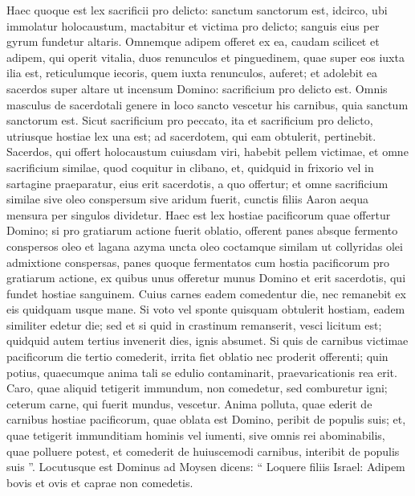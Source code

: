 \begin{biblechapter}
\begin{biblechapter}
\begin{biblechapter}
\begin{biblechapter}
\begin{biblechapter}
\begin{biblechapter}
\begin{biblechapter}
\verse Haec quoque est lex sacrificii pro delicto: sanctum sanctorum est, 
\verse idcirco, ubi immolatur holocaustum, mactabitur et victima pro delicto; sanguis eius per gyrum fundetur altaris. 
\verse Omnemque adipem offeret ex ea, caudam scilicet et adipem, qui operit vitalia, 
\verse duos renunculos et pinguedinem, quae super eos iuxta ilia est, reticulumque iecoris, quem iuxta renunculos, auferet; 
\verse et adolebit ea sacerdos super altare ut incensum Domino: sacrificium pro delicto est. 
\verse Omnis masculus de sacerdotali genere in loco sancto vescetur his carnibus, quia sanctum sanctorum est. 
\verse Sicut sacrificium pro peccato, ita et sacrificium pro delicto, utriusque hostiae lex una est; ad sacerdotem, qui eam obtulerit, pertinebit.
 \verse Sacerdos, qui offert holocaustum cuiusdam viri, habebit pellem victimae, 
\verse et omne sacrificium similae, quod coquitur in clibano, et, quidquid in frixorio vel in sartagine praeparatur, eius erit sacerdotis, a quo offertur; 
\verse et omne sacrificium similae sive oleo conspersum sive aridum fuerit, cunctis filiis Aaron aequa mensura per singulos dividetur.
 \verse Haec est lex hostiae pacificorum quae offertur Domino; 
\verse si pro gratiarum actione fuerit oblatio, offerent panes absque fermento conspersos oleo et lagana azyma uncta oleo coctamque similam ut collyridas olei admixtione conspersas, 
\verse panes quoque fermentatos cum hostia pacificorum pro gratiarum actione, 
\verse ex quibus unus offeretur munus Domino et erit sacerdotis, qui fundet hostiae sanguinem. 
\verse Cuius carnes eadem comedentur die, nec remanebit ex eis quidquam usque mane.
 \verse Si voto vel sponte quisquam obtulerit hostiam, eadem similiter edetur die; sed et si quid in crastinum remanserit, vesci licitum est; 
\verse quidquid autem tertius invenerit dies, ignis absumet.
 \verse Si quis de carnibus victimae pacificorum die tertio comederit, irrita fiet oblatio nec proderit offerenti; quin potius, quaecumque anima tali se edulio contaminarit, praevaricationis rea erit. 
\verse Caro, quae aliquid tetigerit immundum, non comedetur, sed comburetur igni; ceterum carne, qui fuerit mundus, vescetur. 
\verse Anima polluta, quae ederit de carnibus hostiae pacificorum, quae oblata est Domino, peribit de populis suis; 
\verse et, quae tetigerit immunditiam hominis vel iumenti, sive omnis rei abominabilis, quae polluere potest, et comederit de huiuscemodi carnibus, interibit de populis suis ”.
 \verse Locutusque est Dominus ad Moysen dicens: 
\verse “ Loquere filiis Israel: Adipem bovis et ovis et caprae non comedetis. 

\end{biblechapter}
\end{biblechapter}
\end{biblechapter}
\end{biblechapter}
\end{biblechapter}
\end{biblechapter}
\end{biblechapter}
